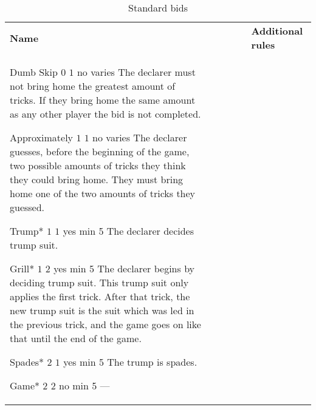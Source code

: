 %
%
%
%

\begin{table}
	\caption{Standard bids}\label{tab:standardBids}
	\begin{center}
		\begin{tabularx}{\textwidth}{lcccc|X}
				\textbf{Name} &
				\rotccw{\textbf{Worth}} &
				\rotccw{\textbf{Score}} &
				\rotccw{\textbf{Trump}} &
				\rotccw{\textbf{Tricks}} &
				\textbf{Additional rules}
				\\[-3ex]

				\standardBidItem%
				{Dumb Skip}
				{$0$}
				{$1$}
				{no}
				{varies}
				{%
					The declarer must not bring home the greatest amount of tricks. If they bring home the same amount as any other player the bid is not completed.
				}

				\standardBidItem%
				{Approximately}
				{$1$}
				{$1$}
				{no}
				{varies}
				{%
					The declarer guesses, before the beginning of the game, two possible amounts of tricks they think they could bring home. They must bring home one of the two amounts of tricks they guessed.
				}

				\standardBidItem%
				{Trump*}
				{$1$}
				{$1$}
				{yes}
				{min 5}
				{%
					The declarer decides trump suit.
				}

				\standardBidItem%
				{Grill*}
				{$1$}
				{$2$}
				{yes}
				{min 5}
				{%
					The declarer begins by deciding trump suit. This trump suit only applies the first trick. After that trick, the new trump suit is the suit which was led in the previous trick, and the game goes on like that until the end of the game.
				}
				
				\standardBidItem%
				{Spades*}
				{$2$}
				{$1$}
				{yes}
				{min 5}
				{%
					The trump is spades.
				}

				\standardBidItem%
				{Game*}
				{$2$}
				{$2$}
				{no}
				{min 5}
				{%
					---
				}


\end{tabularx}
\end{center}
\end{table}
